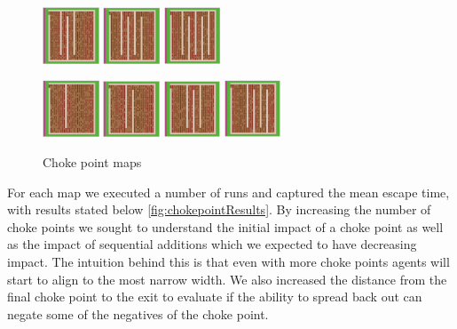 \documentclass[12pt,letterpaper]{article}
\begin{document}
\begin{figure}[ht]
\begin{minipage}[b]{\linewidth}
    \includegraphics[width=0.15\textwidth]{./figures/chokepoint_2_c.png}
    \includegraphics[width=0.15\textwidth]{./figures/chokepoint_2_d.png}
    \includegraphics[width=0.15\textwidth]{./figures/chokepoint_2_e.png}
  \end{minipage}
  \begin{minipage}[b]{\linewidth}
    \includegraphics[width=0.15\textwidth]{./figures/chokepoint_3_a.png}
    \includegraphics[width=0.15\textwidth]{./figures/chokepoint_3_b.png}
    \includegraphics[width=0.15\textwidth]{./figures/chokepoint_3_c.png}
    \includegraphics[width=0.15\textwidth]{./figures/chokepoint_3_d.png}
  \end{minipage}
  \caption{Choke point maps}
\end{figure}

For each map we executed a number of runs and captured the mean escape time, with results stated below \ref{fig:chokepointResults}.  By increasing the number of choke points we sought to understand the initial impact of a choke point as well as the impact of sequential additions which we expected to have decreasing impact. The intuition behind this is that even with more choke points agents will start to align to the most narrow width.  We also increased the distance from the final choke point to the exit to evaluate if the ability to spread back out can negate some of the negatives of the choke point.  
\end{document}
